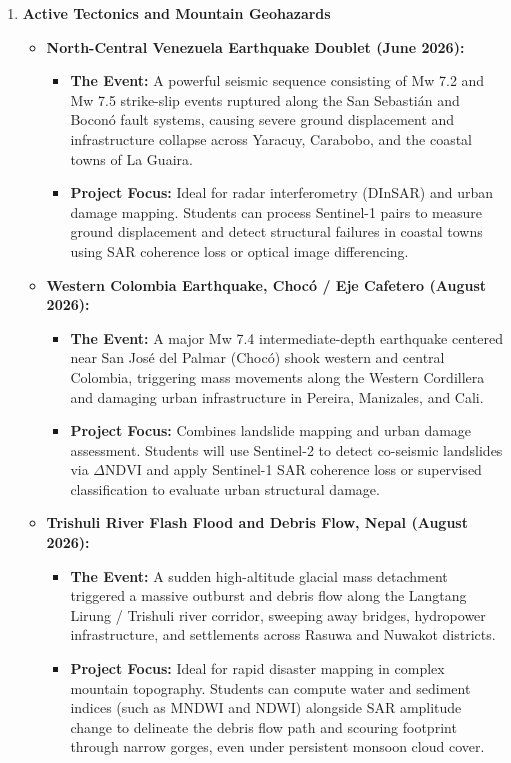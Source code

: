 \documentclass{article}
\begin{document}
\begin{enumerate}
    \item \textbf{Active Tectonics and Mountain Geohazards}
    \begin{itemize}
        \item \textbf{North-Central Venezuela Earthquake Doublet (June 2026):}
            \begin{itemize}
                \item \textbf{The Event:} A powerful seismic sequence consisting of Mw 7.2 and Mw 7.5 strike-slip events ruptured along the San Sebastián and Boconó fault systems, causing severe ground displacement and infrastructure collapse across Yaracuy, Carabobo, and the coastal towns of La Guaira.
                \item \textbf{Project Focus:} Ideal for radar interferometry (DInSAR) and urban damage mapping. Students can process Sentinel-1 pairs to measure ground displacement and detect structural failures in coastal towns using SAR coherence loss or optical image differencing.
            \end{itemize}

            \item \textbf{Western Colombia Earthquake, Chocó / Eje Cafetero (August 2026):}
            \begin{itemize}
                \item \textbf{The Event:} A major Mw 7.4 intermediate-depth earthquake centered near San José del Palmar (Chocó) shook western and central Colombia, triggering mass movements along the Western Cordillera and damaging urban infrastructure in Pereira, Manizales, and Cali.
                \item \textbf{Project Focus:} Combines landslide mapping and urban damage assessment. Students will use Sentinel-2 to detect co-seismic landslides via $\Delta\text{NDVI}$ and apply Sentinel-1 SAR coherence loss or supervised classification to evaluate urban structural damage.
            \end{itemize}

            \item \textbf{Trishuli River Flash Flood and Debris Flow, Nepal (August 2026):}
            \begin{itemize}
                \item \textbf{The Event:} A sudden high-altitude glacial mass detachment triggered a massive outburst and debris flow along the Langtang Lirung / Trishuli river corridor, sweeping away bridges, hydropower infrastructure, and settlements across Rasuwa and Nuwakot districts.
                \item \textbf{Project Focus:} Ideal for rapid disaster mapping in complex mountain topography. Students can compute water and sediment indices (such as MNDWI and NDWI) alongside SAR amplitude change to delineate the debris flow path and scouring footprint through narrow gorges, even under persistent monsoon cloud cover.
            \end{itemize}
        \end{itemize}

\end{enumerate}
\end{document}
